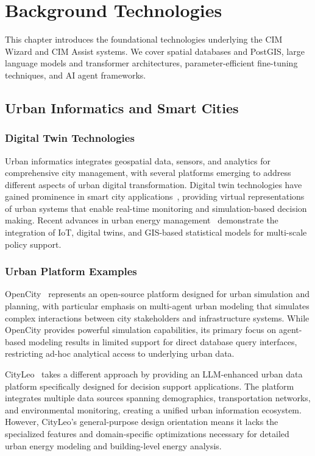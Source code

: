 \chapter{Background Technologies}
\label{ch:background}

This chapter introduces the foundational technologies underlying the CIM Wizard and CIM Assist systems. We cover spatial databases and PostGIS, large language models and transformer architectures, parameter-efficient fine-tuning techniques, and AI agent frameworks.

\section{Urban Informatics and Smart Cities}

\subsection{Digital Twin Technologies}

Urban informatics integrates geospatial data, sensors, and analytics for comprehensive city management, with several platforms emerging to address different aspects of urban digital transformation. Digital twin technologies have gained prominence in smart city applications~\cite{deng2021review,smartcity_digitaltwin2021}, providing virtual representations of urban systems that enable real-time monitoring and simulation-based decision making. Recent advances in urban energy management~\cite{smartcities_energy2023,nouvel2015combining} demonstrate the integration of IoT, digital twins, and GIS-based statistical models for multi-scale policy support.

\subsection{Urban Platform Examples}

OpenCity~\cite{opencity} represents an open-source platform designed for urban simulation and planning, with particular emphasis on multi-agent urban modeling that simulates complex interactions between city stakeholders and infrastructure systems. While OpenCity provides powerful simulation capabilities, its primary focus on agent-based modeling results in limited support for direct database query interfaces, restricting ad-hoc analytical access to underlying urban data.

CityLeo~\cite{cityleo} takes a different approach by providing an LLM-enhanced urban data platform specifically designed for decision support applications. The platform integrates multiple data sources spanning demographics, transportation networks, and environmental monitoring, creating a unified urban information ecosystem. However, CityLeo's general-purpose design orientation means it lacks the specialized features and domain-specific optimizations necessary for detailed urban energy modeling and building-level energy analysis.

